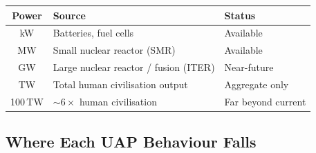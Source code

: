 \documentclass[12pt,a4paper]{article}
\begin{document}
\begin{center}
\begin{tabular}{cll}
\toprule
\textbf{Power} & \textbf{Source} & \textbf{Status} \\
\midrule
kW    & Batteries, fuel cells                    & Available \\
MW    & Small nuclear reactor (SMR)              & Available \\
GW    & Large nuclear reactor / fusion (ITER)    & Near-future \\
TW    & Total human civilisation output          & Aggregate only \\
100\,TW & $\sim 6\times$ human civilisation      & Far beyond current \\
\bottomrule
\end{tabular}
\end{center}

\subsection{Where Each UAP Behaviour Falls}
\end{document}
